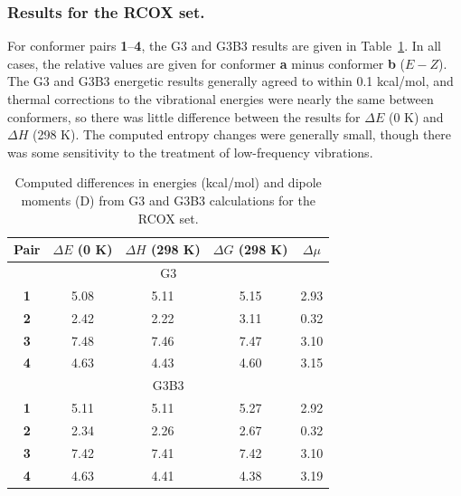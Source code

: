 \documentclass[12pt]{report}
\def\tablab{Table}\def\tabslab{\tablab s}
\newcommand*\tbl[1]{\tablab~\ref{#1}}
\begin{document}

\subsubsection{Results for the RCOX set.}

For conformer pairs \textbf{1}--\textbf{4}, the G3 and G3B3 results are given in \tbl{rcoxg3g3b3}. In all cases, the relative values are given for conformer \textbf{a} minus conformer \textbf{b} ($E - Z$). The G3 and G3B3 energetic results generally agreed to within 0.1 kcal/mol, and thermal corrections to the vibrational energies were nearly the same between conformers, so there was little difference between the results for $\Delta E$ (0 K) and $\Delta H$ (298 K). The computed entropy changes were generally small, though there was some sensitivity to the treatment of low-frequency vibrations.

\bigskip
\begin{table}[ht]
\caption{Computed differences in energies (kcal/mol) and dipole moments (D) from G3 and G3B3 calculations for the RCOX set.}
\centering
\begin{tabular}{ccccc}
\toprule
Pair   & $\Delta E$ (0 K) & $\Delta H$ (298 K) & $\Delta G$ (298 K) & $\Delta \mu$ \\
\midrule
\multicolumn{5}{c}{G3} \\
\midrule
\textbf{1} & 5.08           & 5.11                 & 5.15               & 2.93\\
\textbf{2} & 2.42           & 2.22                 & 3.11               & 0.32\\
\textbf{3} & 7.48           & 7.46                 & 7.47               & 3.10\\
\textbf{4} & 4.63           & 4.43                 & 4.60               & 3.15\\
\midrule
\multicolumn{5}{c}{G3B3} \\
\midrule
\textbf{1} & 5.11           & 5.11                 & 5.27               & 2.92\\
\textbf{2} & 2.34           & 2.26                 & 2.67               & 0.32\\
\textbf{3} & 7.42           & 7.41                 & 7.42               & 3.10\\
\textbf{4} & 4.63           & 4.41                 & 4.38               & 3.19\\
\bottomrule
\end{tabular}
\label{rcoxg3g3b3}
\end{table}
\end{document}
